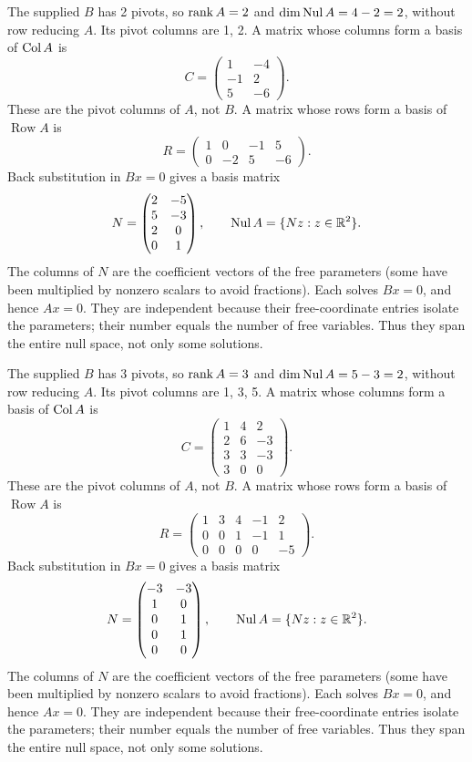 The supplied $B$ has 2 pivots, so $\operatorname{rank} A=2$ and $\dim\operatorname{Nul} A=4-2=2$, without row reducing $A$. Its pivot columns are 1, 2.
A matrix whose columns form a basis of $\operatorname{Col} A$ is
\[ C=\begin{pmatrix}1&-4\\-1&2\\5&-6\end{pmatrix}.\]
These are the pivot columns of $A$, not $B$. A matrix whose rows form a basis of $\operatorname{Row}A$ is
\[ R=\begin{pmatrix}1&0&-1&5\\0&-2&5&-6\end{pmatrix}.\]
Back substitution in $Bx=0$ gives a basis matrix
\[ N=\begin{pmatrix}2&-5\\5&-3\\2&0\\0&1\end{pmatrix},\qquad\operatorname{Nul} A=\{Nz:z\in\mathbb{R}^{2}\}.\]
The columns of $N$ are the coefficient vectors of the free parameters (some have been multiplied by nonzero scalars to avoid fractions). Each solves $Bx=0$, and hence $Ax=0$. They are independent because their free-coordinate entries isolate the parameters; their number equals the number of free variables. Thus they span the entire null space, not only some solutions.

The supplied $B$ has 3 pivots, so $\operatorname{rank} A=3$ and $\dim\operatorname{Nul} A=5-3=2$, without row reducing $A$. Its pivot columns are 1, 3, 5.
A matrix whose columns form a basis of $\operatorname{Col} A$ is
\[ C=\begin{pmatrix}1&4&2\\2&6&-3\\3&3&-3\\3&0&0\end{pmatrix}.\]
These are the pivot columns of $A$, not $B$. A matrix whose rows form a basis of $\operatorname{Row}A$ is
\[ R=\begin{pmatrix}1&3&4&-1&2\\0&0&1&-1&1\\0&0&0&0&-5\end{pmatrix}.\]
Back substitution in $Bx=0$ gives a basis matrix
\[ N=\begin{pmatrix}-3&-3\\1&0\\0&1\\0&1\\0&0\end{pmatrix},\qquad\operatorname{Nul} A=\{Nz:z\in\mathbb{R}^{2}\}.\]
The columns of $N$ are the coefficient vectors of the free parameters (some have been multiplied by nonzero scalars to avoid fractions). Each solves $Bx=0$, and hence $Ax=0$. They are independent because their free-coordinate entries isolate the parameters; their number equals the number of free variables. Thus they span the entire null space, not only some solutions.

